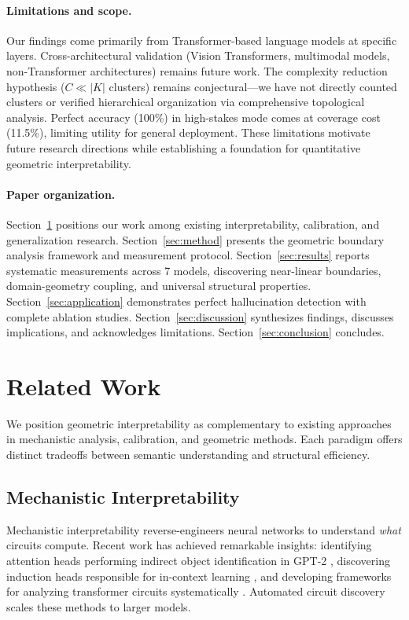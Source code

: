 \documentclass[11pt]{article}
\begin{document}
\paragraph{Limitations and scope.} Our findings come primarily from Transformer-based language models at specific layers. Cross-architectural validation (Vision Transformers, multimodal models, non-Transformer architectures) remains future work. The complexity reduction hypothesis ($C \ll |K|$ clusters) remains conjectural---we have not directly counted clusters or verified hierarchical organization via comprehensive topological analysis. Perfect accuracy (100\%) in high-stakes mode comes at coverage cost (11.5\%), limiting utility for general deployment. These limitations motivate future research directions while establishing a foundation for quantitative geometric interpretability.

\paragraph{Paper organization.} Section~\ref{sec:related} positions our work among existing interpretability, calibration, and generalization research. Section~\ref{sec:method} presents the geometric boundary analysis framework and measurement protocol. Section~\ref{sec:results} reports systematic measurements across 7 models, discovering near-linear boundaries, domain-geometry coupling, and universal structural properties. Section~\ref{sec:application} demonstrates perfect hallucination detection with complete ablation studies. Section~\ref{sec:discussion} synthesizes findings, discusses implications, and acknowledges limitations. Section~\ref{sec:conclusion} concludes.

\section{Related Work}
\label{sec:related}

We position geometric interpretability as complementary to existing approaches in mechanistic analysis, calibration, and geometric methods. Each paradigm offers distinct tradeoffs between semantic understanding and structural efficiency.

\subsection{Mechanistic Interpretability}

Mechanistic interpretability reverse-engineers neural networks to understand \textit{what} circuits compute. Recent work has achieved remarkable insights: identifying attention heads performing indirect object identification in GPT-2 \citep{wang2023interpretability}, discovering induction heads responsible for in-context learning \citep{olsson2022context}, and developing frameworks for analyzing transformer circuits systematically \citep{elhage2021mathematical, olah2020zoom}. Automated circuit discovery \citep{conmy2023towards} scales these methods to larger models.
\end{document}
